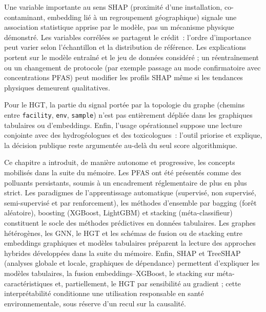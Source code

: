 \label{sec:interpretabilite-limites}

Une variable importante au sens SHAP (proximit\'e d'une installation, co-contaminant, embedding li\'e \`a un regroupement g\'eographique) signale une association statistique apprise par le mod\`ele, pas un m\'ecanisme physique d\'emonstr\'e.
Les variables corr\'el\'ees se partagent le cr\'edit~: l'ordre d'importance peut varier selon l'\'echantillon et la distribution de r\'ef\'erence.
Les explications portent sur le mod\`ele entra\^in\'e et le jeu de donn\'ees consid\'er\'e ; un r\'eentra\^inement ou un changement de protocole (par exemple passage au mode confirmatoire avec concentrations PFAS) peut modifier les profils SHAP m\^eme si les tendances physiques demeurent qualitatives.

Pour le HGT, la partie du signal port\'ee par la topologie du graphe (chemins entre \texttt{facility}, \texttt{env}, \texttt{sample}) n'est pas enti\`erement d\'epli\'ee dans les graphiques tabulaires ou d'embeddings.
Enfin, l'usage op\'erationnel suppose une lecture conjointe avec des hydrog\'eologues et des toxicologues~: l'outil priorise et explique, la d\'ecision publique reste argument\'ee au-del\`a du seul score algorithmique.


\label{sec:synthese-chap1}

Ce chapitre a introduit, de mani\`ere autonome et progressive, les concepts mobilis\'es dans la suite du m\'emoire.
Les PFAS ont \'et\'e pr\'esent\'es comme des polluants persistants, soumis \`a un encadrement r\'eglementaire de plus en plus strict.
Les paradigmes de l'apprentissage automatique (supervis\'e, non supervis\'e, semi-supervis\'e et par renforcement), les m\'ethodes d'ensemble par bagging (for\^et al\'eatoire), boosting (XGBoost, LightGBM) et stacking (m\'eta-classifieur) constituent le socle des m\'ethodes pr\'edictives en donn\'ees tabulaires.
Les graphes h\'et\'erog\`enes, les GNN, le HGT et les sch\'emas de fusion ou de stacking entre embeddings graphiques et mod\`eles tabulaires pr\'eparent la lecture des approches hybrides d\'evelopp\'ees dans la suite du m\'emoire.
Enfin, SHAP et TreeSHAP (analyses globale et locale, graphiques de d\'ependance) permettent d'expliquer les mod\`eles tabulaires, la fusion embeddings--XGBoost, le stacking sur m\'eta-caract\'eristiques et, partiellement, le HGT par sensibilit\'e au gradient ; cette interpr\'etabilit\'e conditionne une utilisation responsable en sant\'e environnementale, sous r\'eserve d'un recul sur la causalit\'e.

